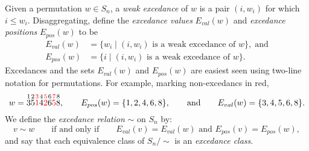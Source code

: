 \documentclass[12pt]{article}
\theoremstyle{definition}
\theoremstyle{remark}
\numberwithin{equation}{section}
\newcommand{\EP}{E_{pos}}
\newcommand{\EV}{E_{val}}
\begin{document}
Given a permutation $w \in S_{n}$, a \emph{weak excedance} of $w$ is a pair $(i, w_{i})$ for which $i \le w_{i}$.  Disaggregating, define the \emph{excedance values} $\EV(w)$ and \emph{excedance positions} $\EP(w)$ to be
\begin{align*}
\EV(w) &= \{ w_{i} \;|\; \text{$(i, w_{i})$ is a weak excedance of $w$}\},\;\text{and} \\[0.5em]
\EP(w) &= \{ i  \;|\; \text{$(i, w_{i})$ is a weak excedance of $w$}\}.
\end{align*}
Excedances and the sets $\EV(w)$ and $\EP(w)$ are easiest seen using two-line notation for permutations.  For example, marking non-excedancs in red,
\[
w = \overset{1}{3} \overset{2}{5} {\color{red} \overset{3}{1}} \overset{4}{4} {\color{red} \overset{5}{2}} \overset{6}{6} {\color{red} \overset{7}{5}} \overset{8}{8},
\qquad
\EP(w) = \{1, 2, 4, 6, 8\},\qquad\text{and}\qquad
\EV(w) = \{3, 4, 5, 6, 8\}.
\]
We define the \emph{excedance relation} $\sim$ on $S_{n}$ by:
\begin{equation}
\label{eq:excednacerel}
v \sim w \qquad\text{if and only if} \qquad \text{$\EV(v) = \EV(w)$ and $\EP(v) = \EP(w)$},
\end{equation}
and say that each equivalence class of $S_{n}/\sim$ is an \emph{excedance class}.
\end{document}
